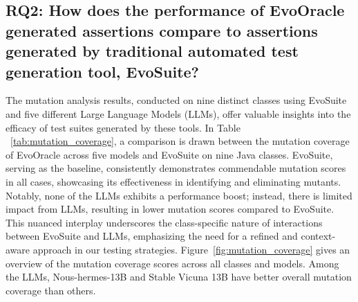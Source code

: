
\vspace{0.1 cm}
\subsection{RQ2: How does the performance of EvoOracle generated assertions compare to assertions generated by traditional automated test generation tool, EvoSuite?}
\label{sec:results_rq2}
\vspace{0.1 cm}

The mutation analysis results, conducted on nine distinct classes using EvoSuite and five different Large Language Models (LLMs), offer valuable insights into the efficacy of test suites generated by these tools. In Table ~\ref{tab:mutation_coverage}, a comparison is drawn between the mutation coverage of EvoOracle across five models and EvoSuite on nine Java classes. EvoSuite, serving as the baseline, consistently demonstrates commendable mutation scores in all cases, showcasing its effectiveness in identifying and eliminating mutants. Notably, none of the LLMs exhibits a performance boost; instead, there is limited impact from LLMs, resulting in lower mutation scores compared to EvoSuite. This nuanced interplay underscores the class-specific nature of interactions between EvoSuite and LLMs, emphasizing the need for a refined and context-aware approach in our testing strategies. Figure~\ref{fig:mutation_coverage} gives an overview of the mutation coverage scores across all classes and models. Among the LLMs, Nous-hermes-13B and Stable Vicuna 13B have better overall mutation coverage than others.

